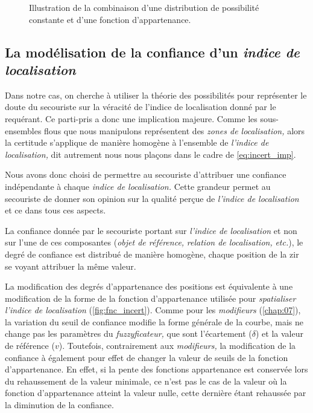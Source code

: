 \begin{figure}
  \centering
  
  \caption{Illustration de la combinaison d'une distribution de
    possibilité constante et d'une fonction d'appartenance.}
  \label{fig:combinaison_incertitude_imprecision}
\end{figure}

\subsection{La modélisation de la confiance d'un \emph{indice de
    localisation}}

Dans notre cas, on cherche à utiliser la théorie des possibilités pour
représenter le doute du secouriste sur la véracité de l'indice de
localisation donné par le requérant. Ce parti-pris a donc une
implication majeure. Comme les sous-ensembles flous que nous
manipulons représentent des \emph{zones de localisation,} alors la
certitude s'applique de manière homogène à l'ensemble de
\emph{l'indice de localisation,} dit autrement nous nous plaçons dans
le cadre de \autoref{eq:incert_imp}.

Nous avons donc choisi de permettre au secouriste d'attribuer une
confiance indépendante à chaque \emph{indice de localisation.} Cette
grandeur permet au secouriste de donner son opinion sur la qualité
perçue de \emph{l'indice de localisation} et ce dans tous ces aspects.

La confiance donnée par le secouriste portant sur \emph{l'indice de
  localisation} et non sur l'une de ces composantes (\eg \emph{objet
  de référence,} \emph{relation de localisation,} \emph{etc.}), le
degré de confiance est distribué de manière homogène, chaque position
de la \ac{zir} se voyant attribuer la même valeur.

La modification des degrés d'appartenance des positions est
équivalente à une modification de la forme de la fonction
d'appartenance utilisée pour \emph{spatialiser l'indice de
  localisation} (\autoref{fig:fnc_incert}). Comme pour les
\emph{modifieurs} (\autoref{chap:07}), la variation du seuil de
confiance modifie la forme générale de la courbe, mais ne change pas
les paramètres du \emph{fuzzyficateur,} que sont l'écartement
(\(\delta\)) et la valeur de référence (\(v\)). Toutefois,
contrairement aux \emph{modifieurs,} la modification de la confiance à
également pour effet de changer la valeur de seuils de la fonction
d'appartenance. En effet, si la pente des fonctions appartenance est
conservée lors du rehaussement de la valeur minimale, ce n'est pas le
cas de la valeur où la fonction d'appartenance atteint la valeur
nulle, cette dernière étant rehaussée par la diminution de la
confiance.

